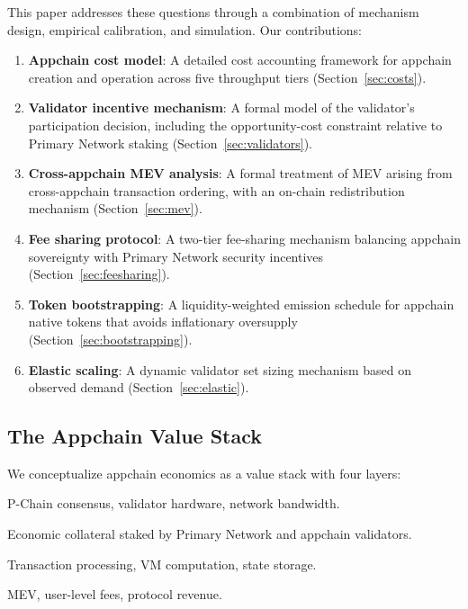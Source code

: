\documentclass[11pt]{article}
\begin{document}
This paper addresses these questions through a combination of mechanism design, empirical
calibration, and simulation. Our contributions:

\begin{enumerate}[leftmargin=1.5em]
  \item \textbf{Appchain cost model}: A detailed cost accounting framework for appchain
    creation and operation across five throughput tiers (Section~\ref{sec:costs}).
  \item \textbf{Validator incentive mechanism}: A formal model of the validator's
    participation decision, including the opportunity-cost constraint relative to
    Primary Network staking (Section~\ref{sec:validators}).
  \item \textbf{Cross-appchain MEV analysis}: A formal treatment of MEV arising from
    cross-appchain transaction ordering, with an on-chain redistribution mechanism
    (Section~\ref{sec:mev}).
  \item \textbf{Fee sharing protocol}: A two-tier fee-sharing mechanism balancing appchain
    sovereignty with Primary Network security incentives (Section~\ref{sec:feesharing}).
  \item \textbf{Token bootstrapping}: A liquidity-weighted emission schedule for appchain
    native tokens that avoids inflationary oversupply (Section~\ref{sec:bootstrapping}).
  \item \textbf{Elastic scaling}: A dynamic validator set sizing mechanism based on
    observed demand (Section~\ref{sec:elastic}).
\end{enumerate}

\subsection{The Appchain Value Stack}

We conceptualize appchain economics as a value stack with four layers:

\begin{description}[leftmargin=2em,style=nextline]
  \item[Layer 1: Infrastructure] P-Chain consensus, validator hardware, network bandwidth.
  \item[Layer 2: Security] Economic collateral staked by Primary Network and appchain
    validators.
  \item[Layer 3: Execution] Transaction processing, VM computation, state storage.
  \item[Layer 4: Application] MEV, user-level fees, protocol revenue.
\end{description}
\end{document}
